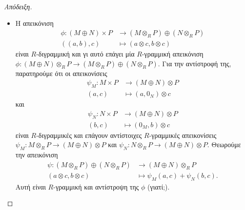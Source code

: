 \documentclass[12pt,a4paper,reqno]{amsart}
\theoremstyle{definition}
\theoremstyle{remark}
\numberwithin{theorem}{section}
\numberwithin{exercise}{section}
\numberwithin{equation}{section}
\renewcommand{\to}{\rightarrow}
\begin{document}
\begin{proof}[Απόδειξη]
\begin{itemize}
    \item[(4)] Η απεικόνιση 
    \begin{align*}
        \phi : \left(
            M \oplus N
        \right) \times P &\to     
        \left(
            M \otimes_R P
        \right) \oplus 
        \left(
            N \otimes_R P
        \right) \\ 
        \left(
            (a,b), c
        \right) &\mapsto \left(a \otimes c, b \otimes c \right)
    \end{align*}
    είναι $R$-διγραμμική και γι αυτό επάγει μία $R$-γραμμική απεικόνιση $\phi : \left(
            M \oplus N
        \right) \otimes_R P \to     
        \left(
            M \otimes_R P
        \right) \oplus 
        \left(
            N \otimes_R P
        \right)$.
    Για την αντίστροφή της, παρατηρούμε ότι οι απεικονίσεις 
    \begin{align*}
        \psi_M : M \times P &\to \left(M\oplus N\right) \otimes P \\
        (a,c) &\mapsto (a,0_N) \otimes c
    \end{align*}
    και 
    \begin{align*}
        \psi_N : N \times P &\to \left(M\oplus N\right) \otimes P \\
        (b,c) &\mapsto (0_M,b) \otimes c
    \end{align*}
    είναι $R$-διγραμμικές και επάγουν αντίστοιχες $R$-γραμμικές απεικονίσεις $\psi_M : M \otimes_R P \to \left(M\oplus N\right) \otimes P$ και $\psi_N : N \otimes_R P \to \left(M\oplus N\right) \otimes P$. Θεωρούμε την απεικόνιση 
    \begin{align*}
        \psi : \left(
            M \otimes_R P
        \right) \oplus 
        \left(
            N \otimes_R P
        \right) &\to \left(
            M \oplus N
        \right) \otimes_R P \\ 
        \left(a \otimes c, b \otimes c\right) &\mapsto \psi_M(a,c) + \psi_N(b,c).
    \end{align*}
    Αυτή είναι $R$-γραμμική και αντίστροψη της $\phi$ (γιατί;).
\end{itemize}
\end{proof}
\end{document}
